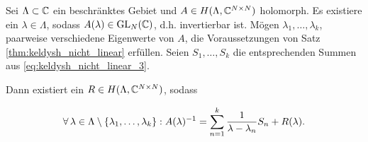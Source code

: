 \begin{corollary} \label{corr:keldysh_multi}

    Sei $\Lambda \subset \mathbb{C}$ ein beschränktes Gebiet und $A \in H(\Lambda, \mathbb{C}^{N \times N})$ holomorph.
    Es existiere ein $\lambda \in \Lambda$, sodass $A(\lambda) \in \operatorname{GL}_N(\mathbb{C})$, d.h. invertierbar ist.
    Mögen $\lambda_1, \dots, \lambda_k$, paarweise verschiedene Eigenwerte von $A$, die Voraussetzungen von Satz \ref{thm:keldysh_nicht_linear} erfüllen.
    Seien $S_1, \dots, S_k$ die entsprechenden Summen aus \eqref{eq:keldysh_nicht_linear_3}.

    Dann existiert ein $R \in H(\Lambda, \mathbb{C}^{N \times N})$, sodass

    \begin{align} \label{keldysh_multi}
      \forall \, \lambda \in \Lambda \setminus {\left \{ \lambda_1, \dots, \lambda_k \right \}}:
        A(\lambda)^{-1}
        =
        \sum_{n=1}^k
            \frac{1}{\lambda - \lambda_n} S_n
        +
        R(\lambda).
    \end{align}

\end{corollary}
